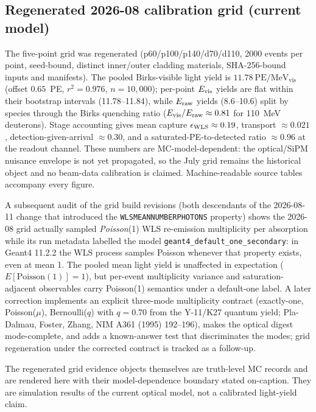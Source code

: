\subsection{Regenerated 2026-08 calibration grid (current model)}
The five-point grid was regenerated (p60/p100/p140/d70/d110, 2000 events per point, seed-bound, distinct inner/outer cladding materials, SHA-256-bound inputs and manifests). The pooled Birks-visible light yield is $11.78~\mathrm{PE/MeV_{vis}}$ (offset $0.65$~PE, $r^2 = 0.976$, $n = 10{,}000$); per-point $E_{\rm vis}$ yields are flat within their bootstrap intervals (11.78--11.84), while $E_{\rm raw}$ yields (8.6--10.6) split by species through the Birks quenching ratio ($E_{\rm vis}/E_{\rm raw} \approx 0.81$ for 110~MeV deuterons). Stage accounting gives mean capture $\epsilon_{\rm WLS}\approx0.19$, transport $\approx0.021$, detection-given-arrival $\approx0.30$, and a saturated-PE-to-detected ratio $\approx0.96$ at the readout channel. These numbers are MC-model-dependent: the optical/SiPM nuisance envelope is not yet propagated, so the July grid remains the historical object and no beam-data calibration is claimed. Machine-readable source tables accompany every figure.

A subsequent audit of the grid build revisions (both descendants of the
2026-08-11 change that introduced the \texttt{WLSMEANNUMBERPHOTONS} property)
shows the 2026-08 grid actually sampled \emph{Poisson}(1) WLS re-emission
multiplicity per absorption while its run metadata labelled the model
\texttt{geant4\_default\_one\_secondary}: in Geant4 11.2.2 the WLS process
samples Poisson whenever that property exists, even at mean 1. The pooled mean
light yield is unaffected in expectation ($E[\mathrm{Poisson}(1)]=1$), but
per-event multiplicity variance and saturation-adjacent observables carry
Poisson(1) semantics under a default-one label. A later correction implements an
explicit three-mode multiplicity contract (exactly-one, Poisson($\mu$),
Bernoulli($q$) with $q=0.70$ from the Y-11/K27 quantum yield; Pla-Dalmau,
Foster, Zhang, NIM A361 (1995) 192--196), makes the optical digest
mode-complete, and adds a known-answer test that discriminates the modes; grid
regeneration under the corrected contract is tracked as a follow-up.

The regenerated grid evidence objects themselves are truth-level MC records and are rendered here with
their model-dependence boundary stated on-caption. They are simulation
results of the current optical model, not a calibrated light-yield claim.

